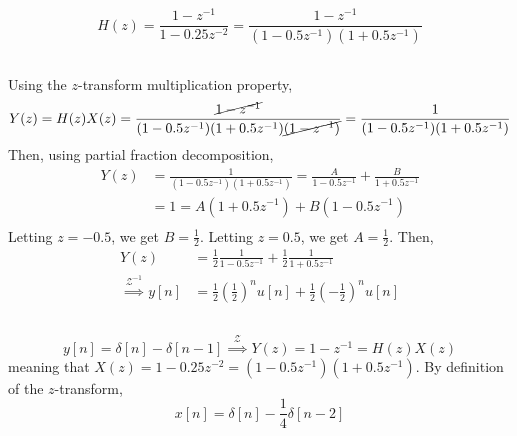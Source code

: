 \documentclass{article}
\begin{document}
\newpage
\section{}

\begin{equation}
    H(z) = \frac{1 - z^{-1}}{1 - 0.25z^{-2}} = \frac{1 - z^{-1}}{(1 - 0.5z^{-1}) (1 + 0.5z^{-1})}
\end{equation}

\subsection{}

Using the \(z\)-transform multiplication property,
\begin{equation}
    Y(z) = H(z) X(z) = \frac{\cancel{1 - z^{-1}}}{(1 - 0.5z^{-1}) (1 + 0.5z^{-1}) \cancel{(1 - z^{-1})}} = \frac{1}{(1 - 0.5z^{-1}) (1 + 0.5z^{-1})}
\end{equation}
Then, using partial fraction decomposition,
\begin{align}
    Y(z) &= \frac{1}{(1 - 0.5z^{-1}) (1 + 0.5z^{-1})} = \frac{A}{1 - 0.5z^{-1}} + \frac{B}{1 + 0.5z^{-1}} \\
    &= 1 = A(1 + 0.5z^{-1}) + B(1 - 0.5z^{-1}) \\
\end{align}
Letting \(z = -0.5\), we get \(B = \frac{1}{2}\).
Letting \(z = 0.5\), we get \(A = \frac{1}{2}\).
Then,
\begin{align}
    Y(z) &= \frac{1}{2} \frac{1}{1 - 0.5z^{-1}} + \frac{1}{2} \frac{1}{1 + 0.5z^{-1}} \\
    \overset{\mathcal{Z}^{-1}}{\implies} y[n] &= \frac{1}{2} \left(\frac{1}{2}\right)^n u[n] + \frac{1}{2} \left(-\frac{1}{2}\right)^n u[n]
\end{align}

\subsection{}

\begin{equation}
    y[n] = \delta[n] - \delta[n - 1] \overset{\mathcal{Z}}{\implies} Y(z) = 1 - z^{-1} = H(z) X(z)
\end{equation}
meaning that \(X(z) = 1 - 0.25z^{-2} = (1 - 0.5z^{-1}) (1 + 0.5z^{-1})\).
By definition of the \(z\)-transform,
\begin{equation}
    x[n] = \delta[n] - \frac{1}{4} \delta[n - 2]
\end{equation}
\end{document}
